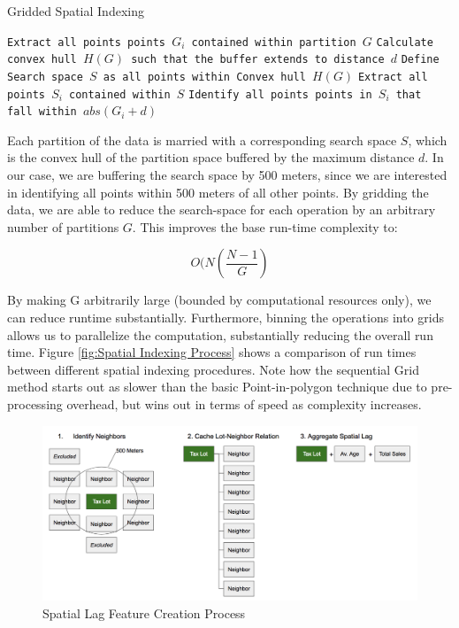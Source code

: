 \documentclass[12pt,]{article}
\begin{document}
\begin{algorithm}
  \caption{Gridded Spatial Indexing}
  \label{alg:spatial1}
  \begin{algorithmic}[1]
        \State \texttt{Extract all points points $G_i$ contained within partition $G$}
        \State \texttt{Calculate convex hull $H(G)$ such that the buffer extends to distance $d$}
        \State \texttt{Define Search space $S$ as all points within Convex hull $H(G)$}
        \State \texttt{Extract all points $S_i$ contained within $S$}
            \State \texttt{Identify all points points in $S_i$ that fall within $abs(G_i+d)$}
        \EndFor
      \EndFor
  \end{algorithmic}
\end{algorithm}

\noindent Each partition of the data is married with a corresponding
search space \(S\), which is the convex hull of the partition space
buffered by the maximum distance \(d\). In our case, we are buffering
the search space by 500 meters, since we are interested in identifying
all points within 500 meters of all other points. By gridding the data,
we are able to reduce the search-space for each operation by an
arbitrary number of partitions \(G\). This improves the base run-time
complexity to:

\[
O(N(\frac{N-1}{G})
\]

\noindent By making G arbitrarily large (bounded by computational
resources only), we can reduce runtime substantially. Furthermore,
binning the operations into grids allows us to parallelize the
computation, substantially reducing the overall run time. Figure
\ref{fig:Spatial Indexing Process} shows a comparison of run times
between different spatial indexing procedures. Note how the sequential
Grid method starts out as slower than the basic Point-in-polygon
technique due to pre-processing overhead, but wins out in terms of speed
as complexity increases.

\begin{figure}[h]
\includegraphics[width=1\linewidth]{Sections/tables and figures/Spatial Lag Creation} \caption{Spatial Lag Feature Creation Process}\label{fig:Spatial Lag Feataure Process}
\end{figure}
\end{document}
